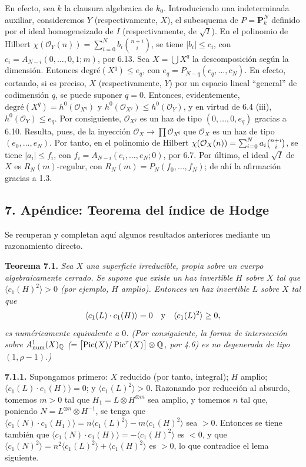 En efecto, sea $k$ la clausura algebraica de $k_0$. Introduciendo una indeterminada auxiliar, consideremos $Y$ (respectivamente, $X$), el subesquema de $P=\mathbf P^N_k$ definido por el ideal homogeneizado de $I$ (respectivamente, de $\sqrt I$). En el polinomio de Hilbert $\chi(\mathcal O_Y(n))=\sum_{i=0}^{N}b_i\binom{n+i}{i}$, se tiene $|b_i|\le c_i$, con $c_i=A_{N-i}(0,\ldots,0,1;m)$, por 6.13. Sea $X=\bigcup X^q$ la descomposición según la dimensión. Entonces $\text{degr\'e}(X^q)\le e_q$, con $e_q=P_{N-q}(c_q,\ldots,c_N)$. En efecto, cortando, si es preciso, $X$ (respectivamente, $Y$) por un espacio lineal ``general'' de codimensión $q$, se puede suponer $q=0$. Entonces, evidentemente, $\text{degr\'e}(X^q)=h^0(\mathcal O_{X^q})$ y $h^0(\mathcal O_{X^q})\le h^0(\mathcal O_Y)$, y en virtud de 6.4 (iii), $h^0(\mathcal O_Y)\le e_q$. Por consiguiente, $\mathcal O_{X^q}$ es un haz de tipo $(0,\ldots,0,e_q)$ gracias a 6.10. Resulta, pues, de la inyección $\mathcal O_X\to \prod\mathcal O_{X^q}$ que $\mathcal O_X$ es un haz de tipo $(e_0,\ldots,e_N)$. Por tanto, en el polinomio de Hilbert $\chi(\mathcal O_X(n))=\sum_{i=0}^{\sisi{n}{N}}a_i\binom{n+i}{i}$, se tiene $|a_i|\le f_i$, con $f_i=A_{N-i}(e_i,\ldots,e_N;0)$, por 6.7. Por último, el ideal $\sqrt I$ de $X$ es $R_N(m)$-regular, con $R_N(m)=P_N(f_0,\ldots,f_N)$; de ahí la afirmación gracias a 1.3. %

\subsection*{7. Apéndice: Teorema del índice de Hodge}

Se recuperan y completan aquí algunos resultados anteriores mediante un razonamiento directo.

\textbf{Teorema 7.1.} \emph{Sea $X$ una superficie irreducible, propia sobre un cuerpo algebraicamente cerrado. Se supone que existe un haz invertible $H$ sobre $X$ tal que $\langle c_1(H)^2\rangle>0$ (por ejemplo, $H$ amplio). Entonces un haz invertible $L$ sobre $X$ tal que}
\[
   \langle c_1(L)\cdot c_1(H)\rangle=0
   \quad\hbox{y}\quad
   \langle c_1(L)^2\rangle\geq 0,
\]
\emph{es numéricamente equivalente a $0$. (Por consiguiente, la forma de intersección sobre $A^1_{\mathrm{num}}(X)_{\Q}$ ($=\bigl[\Pic(X)/\Pic^\tau(X)\bigr]\otimes\Q$, por 4.6) es no degenerada de tipo $(1,\rho-1)$.)}

\textbf{7.1.1.} Supongamos primero: $X$ reducido (por tanto, integral); $H$ amplio; $\langle c_1(L)\cdot c_1(H)\rangle=0$; y $\langle c_1(L)^2\rangle>0$. Razonando por reducción al absurdo, tomemos $m>0$ tal que $H_1=L\otimes H^{\otimes m}$ sea amplio, y tomemos $n$ tal que, poniendo $N=L^{\otimes n}\otimes H^{-1}$, se tenga que $\langle c_1(N)\cdot c_1(H_1)\rangle=n\langle c_1(L)^2\rangle-m\langle c_1(H)^2\rangle$ sea $>0$. Entonces se tiene también que $\langle c_1(N)\cdot c_1(H)\rangle=-\langle c_1(H)^2\rangle$ es $<0$, y que $\langle c_1(N)^2\rangle=n^2\langle c_1(L)^2\rangle+\langle c_1(H)^2\rangle$ es $>0$, lo que contradice el lema siguiente.

